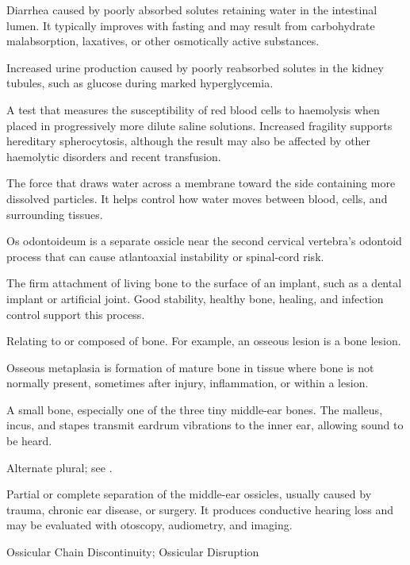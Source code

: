  Diarrhea caused by poorly absorbed solutes retaining water in the intestinal lumen. It
typically improves with fasting and may result from carbohydrate malabsorption,
laxatives, or other osmotically active substances.

 Increased urine production caused by poorly reabsorbed solutes in the kidney tubules, such as glucose during marked hyperglycemia.

 A test that measures the susceptibility of red blood cells to haemolysis when placed in
progressively more dilute saline solutions. Increased fragility supports hereditary
spherocytosis, although the result may also be affected by other haemolytic disorders
and recent transfusion.

 The force that draws water across a membrane toward the side containing more dissolved particles. It helps control how water moves between blood, cells, and surrounding tissues.

 Os odontoideum is a separate ossicle near the second cervical vertebra’s odontoid process that can cause atlantoaxial instability or spinal-cord risk.

 The firm attachment of living bone to the surface of an implant, such as a dental implant or artificial joint. Good stability, healthy bone, healing, and infection control support this process.

 Relating to or composed of bone. For example, an osseous lesion is a bone lesion.

 Osseous metaplasia is formation of mature bone in tissue where bone is not normally present, sometimes after injury, inflammation, or within a lesion.

 A small bone, especially one of the three tiny middle-ear bones. The malleus, incus, and stapes transmit eardrum vibrations to the inner ear, allowing sound to be heard.

 Alternate plural; see .

 Partial or complete separation of the middle-ear ossicles, usually caused by trauma, chronic ear disease, or surgery.
It produces conductive hearing loss and may be evaluated with otoscopy, audiometry, and imaging.

\synonyms
Ossicular Chain Discontinuity; Ossicular Disruption

